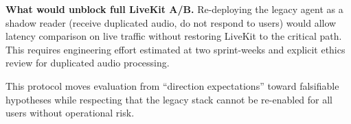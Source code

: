 \textbf{What would unblock full LiveKit A/B.} Re-deploying the legacy agent as a shadow reader (receive duplicated audio, do not respond to users) would allow latency comparison on live traffic without restoring LiveKit to the critical path. This requires engineering effort estimated at two sprint-weeks and explicit ethics review for duplicated audio processing.

This protocol moves evaluation from ``direction expectations'' toward falsifiable hypotheses while respecting that the legacy stack cannot be re-enabled for all users without operational risk.
